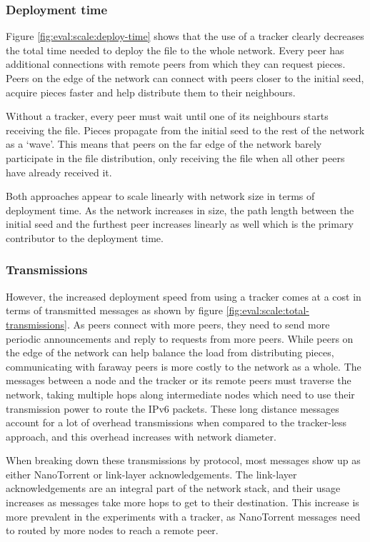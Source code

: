 \subsubsection{Deployment time}
Figure \ref{fig:eval:scale:deploy-time} shows that the use of a tracker clearly decreases the total time needed to deploy the file to the whole network. Every peer has additional connections with remote peers from which they can request pieces. Peers on the edge of the network can connect with peers closer to the initial seed, acquire pieces faster and help distribute them to their neighbours.

Without a tracker, every peer must wait until one of its neighbours starts receiving the file. Pieces propagate from the initial seed to the rest of the network as a `wave'. This means that peers on the far edge of the network barely participate in the file distribution, only receiving the file when all other peers have already received it.

Both approaches appear to scale linearly with network size in terms of deployment time. As the network increases in size, the path length between the initial seed and the furthest peer increases linearly as well which is the primary contributor to the deployment time.

\subsubsection{Transmissions}
However, the increased deployment speed from using a tracker comes at a cost in terms of transmitted messages as shown by figure \ref{fig:eval:scale:total-transmissions}. As peers connect with more peers, they need to send more periodic announcements and reply to requests from more peers. While peers on the edge of the network can help balance the load from distributing pieces, communicating with faraway peers is more costly to the network as a whole. The messages between a node and the tracker or its remote peers must traverse the network, taking multiple hops along intermediate nodes which need to use their transmission power to route the \gls{IPv6} packets. These long distance messages account for a lot of overhead transmissions when compared to the tracker-less approach, and this overhead increases with network diameter.

When breaking down these transmissions by protocol, most messages show up as either NanoTorrent or link-layer acknowledgements. The link-layer acknowledgements are an integral part of the network stack, and their usage increases as messages take more hops to get to their destination. This increase is more prevalent in the experiments with a tracker, as NanoTorrent messages need to routed by more nodes to reach a remote peer.

